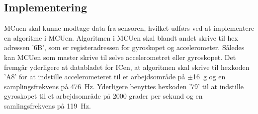 \subsection{Implementering}
MCuen skal kunne modtage data fra sensoren, hvilket udførs ved at implementere en algoritme i MCUen. Algoritmen i MCUen skal blandt andet skrive til hex adressen '6B', som er registeradressen for gyroskopet og accelerometer. Således kan MCUen som master skrive til selve accelerometret eller gyroskopet. Det fremgår yderligere at databladet for ICen, at algoritmen skal skrive til hexkoden 'A8' for at indstille accelerometeret til et arbejdsområde på $\pm$16~g og en samplingsfrekvens på 476~Hz. Yderligere benyttes hexkoden '79' til at indstille gyroskopet til et arbejdsområde på 2000 grader per sekund og en samlingsfrekvens på 119~Hz. \citep{STMicroelectronics2016}

